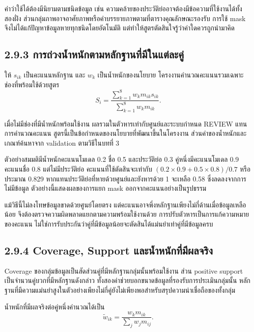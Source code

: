 \documentclass[12pt,a4paper]{report}
\begin{document}
คำว่าใช้ได้ต้องมีนิยามตามชนิดข้อมูล เช่น ความคล้ายของประวัติย่ออาจต้องมีข้อความที่ใช้งานได้ทั้งสองฝั่ง ส่วนกลุ่มภาพอาจอาศัยภาพหรือคำบรรยายภาพตามที่ตารางคุณลักษณะรองรับ การใช้ mask จึงไม่ได้แก้ปัญหาข้อมูลหายทุกชนิดโดยอัตโนมัติ แต่ทำให้สูตรตัดสินใจรู้ว่าค่าใดควรถูกนำมาคิด

\subsection*{2.9.3 การถ่วงน้ำหนักตามหลักฐานที่มีในแต่ละคู่}
ให้ $s_{ik}$ เป็นคะแนนหลักฐาน และ $w_k$ เป็นน้ำหนักของนโยบาย โครงงานคำนวณคะแนนรวมเฉพาะช่องที่พร้อมใช้ด้วยสูตร
\begin{equation*}
S_i=\frac{\sum_{k=1}^{8}w_km_{ik}s_{ik}}{\sum_{k=1}^{8}w_km_{ik}}.
\end{equation*}

เมื่อไม่มีช่องที่มีน้ำหนักพร้อมใช้งาน ผลรวมในตัวหารเท่ากับศูนย์และระบบกำหนด REVIEW แทนการคำนวณคะแนน สูตรนี้เป็นข้อกำหนดของนโยบายที่พัฒนาขึ้นในโครงงาน ส่วนค่าของน้ำหนักและเกณฑ์ค้นหาจาก validation ตามวิธีในบทที่ 3

ตัวอย่างสมมติมีน้ำหนักคะแนนโมเดล 0.2 ชื่อ 0.5 และประวัติย่อ 0.3 คู่หนึ่งมีคะแนนโมเดล 0.9 คะแนนชื่อ 0.8 แต่ไม่มีประวัติย่อ คะแนนที่ใช้ตัดสินจะเท่ากับ $(0.2\times0.9+0.5\times0.8)/0.7$ หรือประมาณ 0.829 หากแทนประวัติย่อที่หายด้วยศูนย์และยังหารด้วย 1 จะเหลือ 0.58 ซึ่งลดลงจากการไม่มีข้อมูล ตัวอย่างนี้แสดงผลของการแยก mask ออกจากคะแนนอย่างเป็นรูปธรรม

แม้วิธีนี้ไม่ลงโทษข้อมูลขาดด้วยศูนย์โดยตรง แต่คะแนนอาจพึ่งหลักฐานเพียงไม่กี่ด้านเมื่อข้อมูลเหลือน้อย จึงต้องตรวจความผิดพลาดแยกตามความพร้อมใช้งานด้วย การปรับตัวหารเป็นการแก้ความหมายของคะแนน ไม่ใช่การรับประกันว่าคู่ที่มีข้อมูลน้อยจะตัดสินได้แม่นยำเท่าคู่ที่มีข้อมูลครบ

\subsection*{2.9.4 Coverage, Support และน้ำหนักที่มีผลจริง}
Coverage ของกลุ่มข้อมูลเป็นสัดส่วนคู่ที่มีหลักฐานกลุ่มนั้นพร้อมใช้งาน ส่วน positive support เป็นจำนวนคู่บวกที่มีหลักฐานดังกล่าว ทั้งสองค่าช่วยบอกขนาดข้อมูลที่รองรับการประเมินกลุ่มนั้น หลักฐานที่มีความแม่นยำสูงในตัวอย่างเพียงไม่กี่คู่ยังไม่เพียงพอสำหรับสรุปความน่าเชื่อถือของทั้งกลุ่ม

น้ำหนักที่มีผลจริงต่อคู่หนึ่งคำนวณได้เป็น
\begin{equation*}
\widetilde{w}_{ik}=\frac{w_km_{ik}}{\sum_jw_jm_{ij}}.
\end{equation*}
\end{document}
